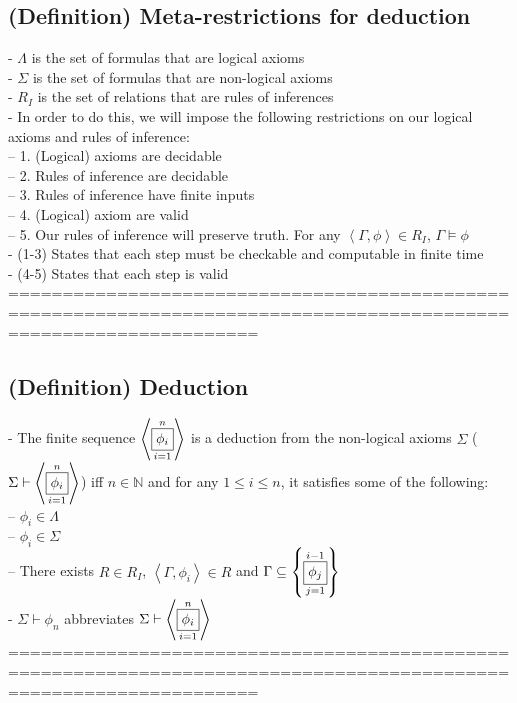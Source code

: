\documentclass{book}
\newcommand{\set}[1]{\left\{ #1 \right\}}
\newcommand{\seq}[1]{\left\langle #1 \right\rangle}
\newcommand{\vdc}[3]{\underset{#2}{\overset{#3}{\fbox{$#1$}}}}
\begin{document}
\subsection{(Definition) Meta-restrictions for deduction} %
	- $\Lambda$ is the set of formulas that are logical axioms \\
	- $\Sigma$ is the set of formulas that are non-logical axioms \\
	- $R_I$ is the set of relations that are rules of inferences \\
 - In order to do this, we will impose the following restrictions on our logical axioms and rules of inference: \\
  -- 1. (Logical) axioms are decidable \\
  -- 2. Rules of inference are decidable \\
  -- 3. Rules of inference have finite inputs \\
  -- 4. (Logical) axiom are valid \\
  -- 5. Our rules of inference will preserve truth. For any $\seq{\Gamma, \phi} \in R_I$, $\Gamma \vDash \phi$ \\
 - (1-3) States that each step must be checkable and computable in finite time \\
 - (4-5) States that each step is valid \\
	===================================================================================================================
\subsection{(Definition) Deduction} %
	- The finite sequence $\seq{\vdc{\phi_i}{i=1}{n}}$ is a deduction from the non-logical axioms $\Sigma$ ($\Sigma \vdash \seq{\vdc{\phi_i}{i=1}{n}}$) iff $n \in \mathbb{N}$ and for any $1 \leq i \leq n$, it satisfies some of the following: \\
		-- $\phi_i \in \Lambda$ \\
		-- $\phi_i \in \Sigma$ \\
		-- There exists $R \in R_I$, $\seq{\Gamma, \phi_i} \in R$ and $\Gamma \subseteq \set{\vdc{\phi_j}{j=1}{i-1}}$ \\
	- $\Sigma \vdash \phi_n$ abbreviates $\Sigma \vdash \seq{\vdc{\phi_i}{i=1}{n}}$ \\
	===================================================================================================================
\end{document}

